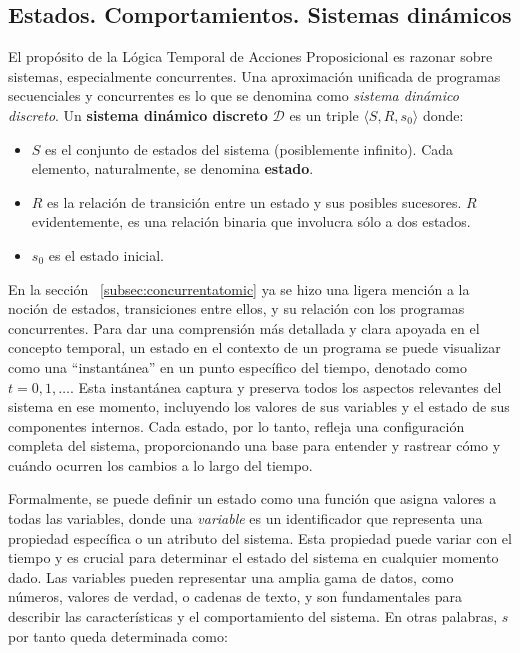 \subsection{Estados. Comportamientos. Sistemas dinámicos}\label{subsection:TLAsystems}
El propósito de la Lógica Temporal de Acciones Proposicional es razonar sobre sistemas, especialmente concurrentes. Una aproximación unificada de programas secuenciales y concurrentes es lo que se denomina como \textit{sistema dinámico discreto}. Un \textbf{sistema dinámico discreto} $\mathcal{D}$ es un triple $\langle S, R, s_0 \rangle$ donde:

\begin{itemize}
    \item $S$ es el conjunto de estados del sistema (posiblemente infinito). Cada elemento, naturalmente, se denomina \textbf{estado}.
    \item $R$ es la relación de transición entre un estado y sus posibles sucesores. $R$ evidentemente, es una relación binaria que involucra sólo a dos estados.
    \item $s_0$ es el estado inicial.
\end{itemize}

En la sección ~\ref{subsec:concurrentatomic} ya se hizo una ligera mención a la noción de estados, transiciones entre ellos, y su relación con los programas concurrentes. Para dar una comprensión más detallada y clara apoyada en el concepto temporal, un estado en el contexto de un programa se puede visualizar como una ``instantánea'' en un punto específico del tiempo, denotado como $t = 0, 1, \ldots$. Esta instantánea captura y preserva todos los aspectos relevantes del sistema en ese momento, incluyendo los valores de sus variables y el estado de sus componentes internos. Cada estado, por lo tanto, refleja una configuración completa del sistema, proporcionando una base para entender y rastrear cómo y cuándo ocurren los cambios a lo largo del tiempo. 

Formalmente, se puede definir un estado como una función que asigna valores a todas las variables, donde una \textit{variable}  es un identificador que representa una propiedad específica o un atributo del sistema. Esta propiedad puede variar con el tiempo y es crucial para determinar el estado del sistema en cualquier momento dado. Las variables pueden representar una amplia gama de datos, como números, valores de verdad, o cadenas de texto, y son fundamentales para describir las características y el comportamiento del sistema. En otras palabras, $s$ por tanto queda determinada como:

